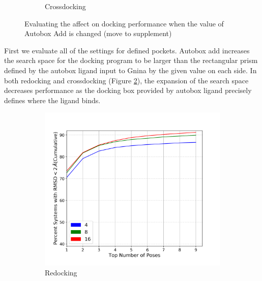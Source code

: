 \documentclass[journal=jcisd8,manuscript=article]{achemso}
\begin{document}
\begin{figure}
\begin{subfigure}[b]{0.48\textwidth}
		\caption{Crossdocking}
		\label{fig:AutoboxAddCrossdock}
        \end{subfigure}    
	\caption{Evaluating the affect on docking performance when the value of Autobox Add is changed (move to supplement)}
	\label{fig:AutoboxAdd}
\end{figure}    
First we evaluate all of the settings for defined pockets. Autobox add increases the search space for the docking program to be larger than the rectangular prism defined by the autobox ligand input to Gnina by the given value on each side. In both redocking and crossdocking (Figure \ref{fig:AutoboxAdd}), the expansion of the search space decreases performance as the docking box provided by autobox ligand precisely defines where the ligand binds.

\begin{figure}    
        \begin{subfigure}[b]{0.48\textwidth}    
		\centering
		\includegraphics[width=\textwidth]{figures/redocking/sweep_exhaustiveness_line.png}
		\caption{Redocking}
		\label{fig:exhaustiveness rd}
        \end{subfigure}    
        \begin{subfigure}[b]{0.48\textwidth}    
		\centering

\end{subfigure}
\end{figure}
\end{document}
